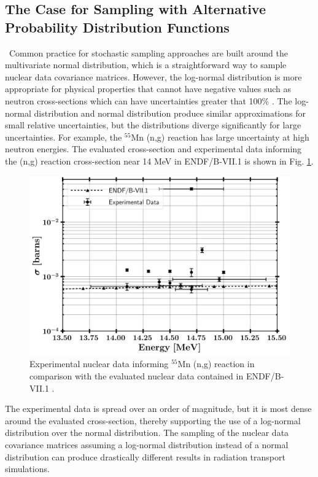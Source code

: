 \subsection{The Case for Sampling with Alternative Probability Distribution Functions}
\ Common practice for stochastic sampling approaches are built around the multivariate normal distribution, which is a straightforward way to sample nuclear data covariance matrices. 
However, the log-normal distribution is more appropriate for physical properties that cannot have negative values such as neutron cross-sections which can have uncertainties greater that 100\% \cite{Zerovnik2013}. 
The log-normal distribution and normal distribution produce similar approximations for small relative uncertainties, but the distributions diverge significantly for large uncertainties. 
For example, the $\mathrm{^{55}}$Mn (n,g) reaction has large uncertainty at high neutron energies. 
The evaluated cross-section and experimental data informing the (n,g) reaction cross-section near 14 MeV in ENDF/B-VII.1 is shown in Fig. \ref{fig:Mn}. 

\begin{figure}[htb!]
	\includegraphics[width=\linewidth]{Figures/Chapter3/Mn_Eval.png}
	\caption{Experimental nuclear data informing $\mathrm{^{55}}$Mn (n,g) reaction in comparison with the evaluated nuclear data contained in ENDF/B-VII.1 \cite{ENDF}.}
	\label{fig:Mn}
\end{figure}

The experimental data is spread over an order of magnitude, but it is most dense around the evaluated cross-section, thereby supporting the use of a log-normal distribution over the normal distribution. 
The sampling of the nuclear data covariance matrices assuming a log-normal distribution instead of  a normal distribution can produce drastically different results in radiation transport simulations. 

